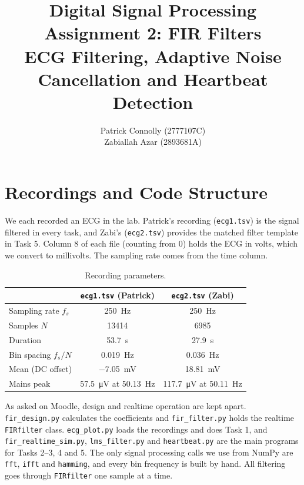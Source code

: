 \documentclass[11pt,a4paper]{article}
\title{\textbf{Digital Signal Processing}\\[4pt]
       Assignment 2: FIR Filters\\[2pt]
       \large ECG Filtering, Adaptive Noise Cancellation and Heartbeat Detection}
\author{%
  Patrick Connolly (2777107C)\\
  Zabiallah Azar (2893681A)}
\date{}
\begin{document}
\maketitle

\section*{Recordings and Code Structure}
\label{sec:method}

We each recorded an ECG in the lab. Patrick's recording (\texttt{ecg1.tsv}) is
the signal filtered in every task, and Zabi's (\texttt{ecg2.tsv}) provides the
matched filter template in Task 5. Column 8 of each file (counting from 0)
holds the ECG in volts, which we convert to millivolts. The sampling rate
comes from the time column.

\begin{table}[htbp]
  \centering
  \caption{Recording parameters.}
  \label{tab:recording}
  \begin{tabular}{@{}lcc@{}}
    \toprule
    & \texttt{ecg1.tsv} (Patrick) & \texttt{ecg2.tsv} (Zabi) \\
    \midrule
    Sampling rate $f_s$        & \SI{250}{\hertz} & \SI{250}{\hertz} \\
    Samples $N$                & \num{13414} & \num{6985} \\
    Duration                   & \SI{53.7}{\second} & \SI{27.9}{\second} \\
    Bin spacing $f_s/N$        & \SI{0.019}{\hertz} & \SI{0.036}{\hertz} \\
    Mean (DC offset)           & \SI{-7.05}{\milli\volt} & \SI{18.81}{\milli\volt} \\
    Mains peak                 & \SI{57.5}{\micro\volt} at \SI{50.13}{\hertz}
                               & \SI{117.7}{\micro\volt} at \SI{50.11}{\hertz} \\
    \bottomrule
  \end{tabular}
\end{table}

As asked on Moodle, design and realtime operation are kept apart.
\texttt{fir\_design.py} calculates the coefficients and \texttt{fir\_filter.py}
holds the realtime \texttt{FIRfilter} class. \texttt{ecg\_plot.py} loads the
recordings and does Task 1, and \texttt{fir\_realtime\_sim.py},
\texttt{lms\_filter.py} and \texttt{heartbeat.py} are the main programs for
Tasks 2--3, 4 and 5. The only signal processing calls we use from NumPy are
\texttt{fft}, \texttt{ifft} and \texttt{hamming}, and every bin frequency is
built by hand. All filtering goes through \texttt{FIRfilter} one sample at a
time.
\end{document}
